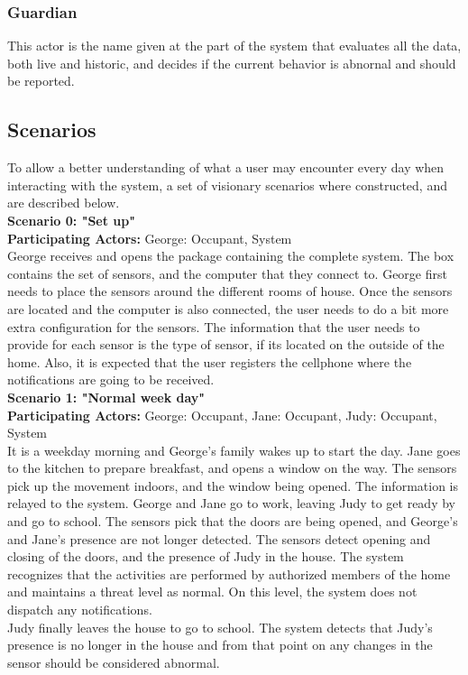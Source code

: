 \subsubsection{Guardian}
This actor is the name given at the part of the system that evaluates all the data, both live and historic, and decides if the current behavior is abnornal and should be reported.

\subsection{Scenarios}
\label{scenarios}
To allow a better understanding of what a user may encounter every day when interacting with the system, a set of visionary scenarios where constructed, and are described below.\\

\textbf{Scenario 0: "Set up"} \\
\textbf{Participating Actors:} George: Occupant, System \\
George receives and opens the package containing the complete system. The box contains the set of sensors, and the computer that they connect to. George first needs to place the sensors around the different rooms of house. Once the sensors are located and the computer is also connected, the user needs to do a bit more extra configuration for the sensors. The information that the user needs to provide for each sensor is the type of sensor, if its located on the outside of the home. Also, it is expected that the user registers the cellphone where the notifications are going to be received.\\

\textbf{Scenario 1: "Normal week day"} \\
\textbf{Participating Actors:} George: Occupant, Jane: Occupant, Judy: Occupant, System \\
It is a weekday morning and George's family wakes up to start the day. Jane goes to the kitchen to prepare breakfast, and opens a window on the way. The sensors pick up the movement indoors, and the window being opened. The information is relayed to the system. George and Jane go to work, leaving Judy to get ready by and go to school. The sensors pick that the doors are being opened, and George's and Jane's presence are not longer detected. The sensors detect opening and closing of the doors, and the presence of Judy in the house. The system recognizes that the activities are performed by authorized members of the home and maintains a threat level as normal. On this level, the system does not dispatch any notifications.\\
Judy finally leaves the house to go to school. The system detects that Judy's presence is no longer in the house and from that point on any changes in the sensor should be considered abnormal. \\

